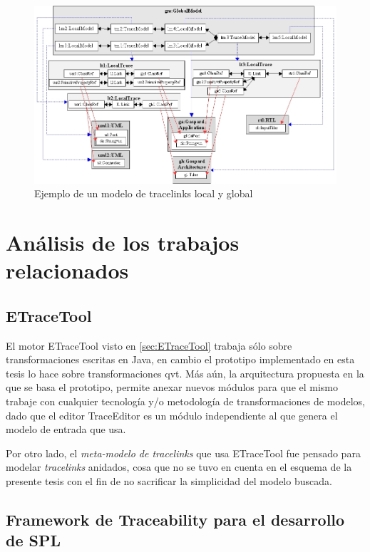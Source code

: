\documentclass[a4paper,12pt,oneside,spanish]{book}
\begin{document}
\begin{figure}[hbtp]
\centering
\includegraphics[scale=.46]{./img/EjemploLocalGlobalMetamodel}
\caption{Ejemplo de un modelo de tracelinks local y global}
\label{fig:EjemploLocalGlobalMetamodel}
\end{figure}



\section{Análisis de los trabajos relacionados}


\subsection*{ETraceTool}

El motor \textsf{ETraceTool} visto en \ref{sec:ETraceTool} trabaja sólo sobre transformaciones escritas en \textsf{Java}, en cambio el prototipo implementado en esta tesis lo hace sobre transformaciones \gls{qvt}. Más aún, la arquitectura propuesta en la que se basa el prototipo, permite anexar nuevos módulos para que el mismo trabaje con cualquier tecnología y/o metodología de transformaciones de modelos, dado que el editor \textsf{TraceEditor} es un módulo independiente al que genera el modelo de entrada que usa.

Por otro lado, el \textit{meta-modelo de tracelinks} que usa \textsf{ETraceTool} fue pensado para modelar \textit{tracelinks} anidados, cosa que no se tuvo en cuenta en el esquema de la presente tesis con el fin de no sacrificar la simplicidad del modelo buscada.


\subsection*{Framework de Traceability para el desarrollo de SPL}
\end{document}
